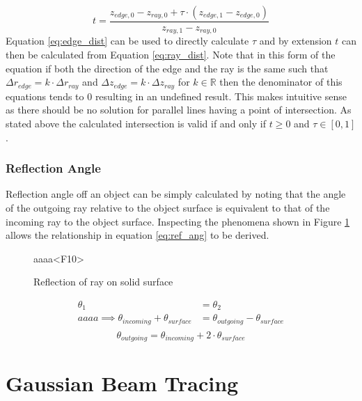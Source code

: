 \documentclass{article}
\begin{document}
\begin{equation}
	\label{eq:ray_dist}
	t = \frac{ z_{edge, 0} - z_{ray, 0} + \tau\cdot(z_{edge, 1} - z_{edge, 0})}{z_{ray, 1} - z_{ray, 0}}
\end{equation}
Equation \ref{eq:edge_dist} can be used to directly calculate $\tau$ and by extension $t$ can then be calculated from Equation \ref{eq:ray_dist}. Note that in this form of the equation if both the direction of the edge and the ray is the same such that $\Delta r_{edge} = k\cdot\Delta r_{ray}$ and $\Delta z_{edge} = k\cdot\Delta z_{ray}$ for $k\in\mathbb{R}$ then the denominator of this equations tends to $0$ resulting in an undefined result. This makes intuitive sense as there should be no solution for parallel lines having a point of intersection. As stated above the calculated intersection is valid if and only if $t\geq0$ and $\tau\in[0, 1]$.

\subsubsection{Reflection Angle}
Reflection angle off an object can be simply calculated by noting that the angle of the outgoing ray relative to the object surface is equivalent to that of the incoming ray to the object surface. Inspecting the phenomena shown in Figure \ref{fig:reflect_diagram} allows the relationship in equation \ref{eq:ref_ang} to be derived.
\begin{figure}[H]
	\centering
	
	\caption{Reflection of ray on solid surface}
	\label{fig:reflect_diagram}aaaa<F10>
\end{figure}
\begin{align*}
	\theta_1                                      & = \theta_2                             \\aaaa
	\implies \theta_{incoming} + \theta_{surface} & = \theta_{outgoing} - \theta_{surface} \\
\end{align*}
\begin{equation}
	\label{eq:ref_ang}
	\theta_{outgoing} = \theta_{incoming} + 2\cdot\theta_{surface}
\end{equation}

\section{Gaussian Beam Tracing}
\end{document}
